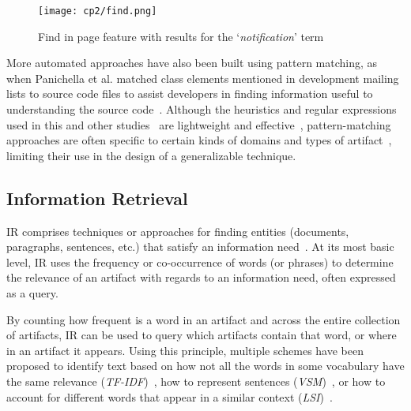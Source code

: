 \medskip
\begin{figure}[h!]
    \centering
    \texttt{[image: cp2/find.png]}
    \caption{Find in page feature with results for the `\textit{notification}' term}
    \label{fig:find-in-page}
\end{figure}


More automated approaches have also been built using pattern matching, 
as when Panichella et al. 
matched class elements mentioned in development mailing 
 lists to source code files
to assist developers in finding information useful to 
 understanding the source code~\cite{panichella2012}.
Although the heuristics and regular expressions used in this and other studies~\cite{nadi2020, Maalej2013}
are lightweight and effective~\cite{Bavota2016}, 
pattern-matching approaches 
are often specific to certain kinds of domains and types of artifact~\cite{fucci2019}, 
limiting their use in the design of a generalizable technique.






\subsection{Information Retrieval }
\label{cp2:information-retrieval}


\acf{IR} comprises techniques
or approaches for finding entities (documents, paragraphs, sentences, etc.)
that satisfy an information need~\cite{manning2010IR}.
At its most basic level, 
\acs{IR}
uses the 
frequency or co-occurrence of words (or phrases) to determine the relevance
of an artifact with regards to an information need, often expressed as a query.


By counting how frequent is a word in 
an artifact and across the entire collection of artifacts, 
\acs{IR} can be used to query which artifacts contain that word, or where in an artifact it appears. 
Using this principle, multiple schemes have been proposed 
to identify text based on 
how not all the words in some vocabulary have the same relevance (\textit{TF-IDF})~\cite{luhn1957tf, jones2004idf}, 
how to  represent sentences (\textit{VSM})~\cite{salton1975vector}, 
or how to account for different words that appear in a similar context (\textit{LSI})~\cite{dumais1994latent}.



